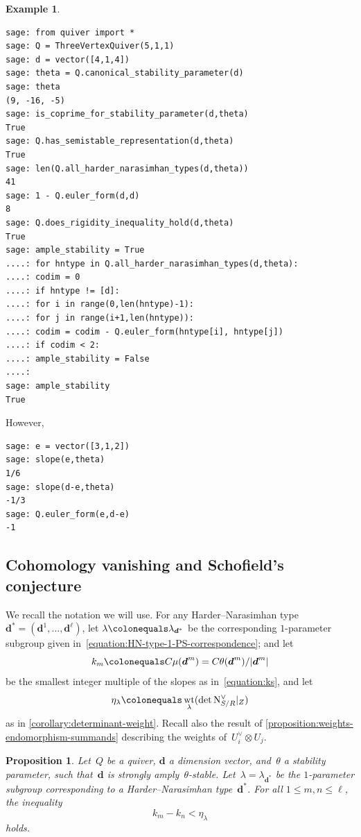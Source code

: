 \documentclass[11pt]{article}
\theoremstyle{plain}
\newtheorem{proposition}[theorem]{Proposition}
\theoremstyle{definition}
\newtheorem{example}[theorem]{Example}
\DeclareMathOperator\weight{wt}
\newcommand\normal{\ensuremath{\mathrm{N}}}
\newcommand\tuple[1]{\ensuremath{{\boldsymbol{#1}}}}
\begin{document}
\begin{example}
\begin{verbatim}
sage: from quiver import *
sage: Q = ThreeVertexQuiver(5,1,1)
sage: d = vector([4,1,4])
sage: theta = Q.canonical_stability_parameter(d)
sage: theta
(9, -16, -5)
sage: is_coprime_for_stability_parameter(d,theta)
True
sage: Q.has_semistable_representation(d,theta)
True
sage: len(Q.all_harder_narasimhan_types(d,theta))
41
sage: 1 - Q.euler_form(d,d)
8
sage: Q.does_rigidity_inequality_hold(d,theta)
True
sage: ample_stability = True
....: for hntype in Q.all_harder_narasimhan_types(d,theta):
....: codim = 0
....: if hntype != [d]:
....: for i in range(0,len(hntype)-1):
....: for j in range(i+1,len(hntype)):
....: codim = codim - Q.euler_form(hntype[i], hntype[j])
....: if codim < 2:
....: ample_stability = False
....:
sage: ample_stability
True
\end{verbatim}
However,
\begin{verbatim}
sage: e = vector([3,1,2])
sage: slope(e,theta)
1/6
sage: slope(d-e,theta)
-1/3
sage: Q.euler_form(e,d-e)
-1
\end{verbatim}
\fi
\end{example}

\subsection{Cohomology vanishing and Schofield's conjecture}
\label{subsection:cohomology-vanishing}
We recall the notation we will use.
For any Harder--Narasimhan type $\tuple{d}^* = (\tuple{d}^1,\dots,\tuple{d}^\ell)$,
let $\lambda \colonequals \lambda_{\tuple{d}^*}$ be the corresponding $1$-parameter subgroup
given in~\eqref{equation:HN-type-1-PS-correspondence};
and let\vspace*{-3pt}
\begin{equation*}
k_m \colonequals C\mu(\tuple{d}^m)=C\theta(\tuple{d}^m)/\lvert\tuple{d}^m\rvert
\end{equation*}
be the smallest integer multiple of the slopes
as in~\eqref{equation:ks},
and let\vspace*{-3pt}
\begin{equation*}
\eta_\lambda\colonequals\weight_\lambda(\det\normal_{S/R}^\vee|_Z)
\end{equation*}
as in \cref{corollary:determinant-weight}.
Recall also the result of \cref{proposition:weights-endomorphism-summands}
describing the weights of~$U_i^\vee\otimes U_j$.

\begin{proposition}
\label{proposition:inequality}
Let~$Q$ be a quiver,
$\tuple{d}$ a dimension vector,
and~$\theta$ a stability parameter,
such that~$\tuple{d}$ is strongly amply~$\theta$-stable.
Let~$\lambda=\lambda_{\tuple{d}^*}$ be the $1$-parameter subgroup
corresponding to a Harder--Narasimhan type~$\tuple{d}^*$.
For all $1 \leq m,n\leq\ell$, the inequality\vspace*{-3pt}
\begin{equation}
\label{equation:teleman-inequality}
k_m-k_n<\eta_\lambda
\end{equation}
holds.
\end{proposition}
\end{document}
